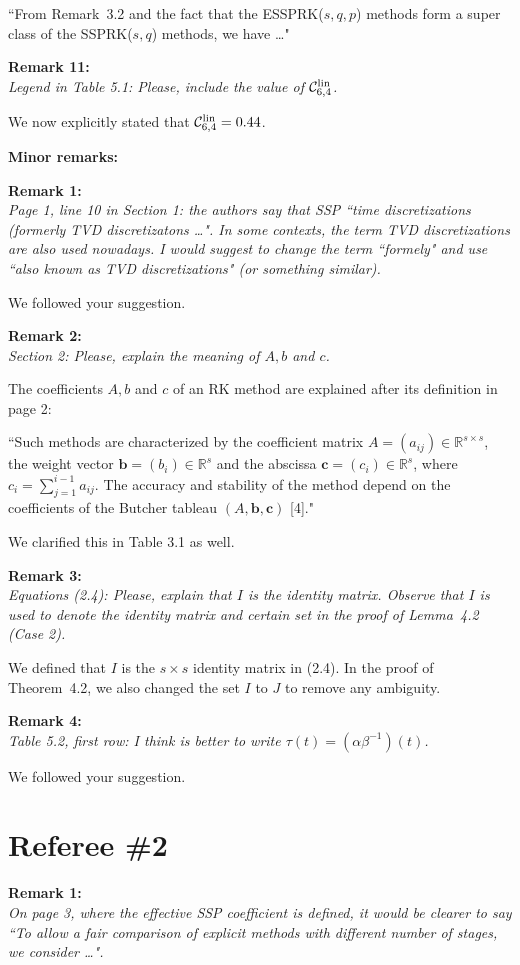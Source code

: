 \documentclass[12pt]{article}
\newcommand{\remark}[2]{\vspace{25pt} \noindent \textbf{Remark #1:\newline} \textit{#2}\vspace{15pt}}
\renewcommand{\newline}{\vspace{15pt}\\}
\newcommand{\sspcoef}{\mathcal{C}}
\begin{document}
``From Remark~3.2 and the fact that the ESSPRK($s,q,p$) methods 
form a super class of the SSPRK($s,q$) methods, we have \dots"

\remark{11}{
Legend in Table 5.1: Please, include the value of $\sspcoef^{\textnormal{lin}}_{6,4}$.}

We now explicitly stated that $\sspcoef^{\textnormal{lin}}_{6,4}=0.44$.
\vspace{20pt}

\noindent \textbf{\large Minor remarks:}

\remark{1}{
Page 1, line 10 in Section 1: the authors say that SSP ``time discretizations (formerly
TVD discretizatons \dots". 
In some contexts, the term TVD discretizations are also used nowadays. 
I would suggest to change the term ``formely" and use ``also known as TVD discretizations" 
(or something similar).}

We followed your suggestion.

\remark{2}{
Section 2: Please, explain the meaning of $A, b$ and $c$.}

The coefficients $A, b$ and $c$ of an RK method are explained after its definition in page 2:

``Such methods are characterized by the coefficient matrix $A = (a_{ij}) \in 
\mathbb{R}^{s \times s}$, the weight vector $\bm{b} = (b_i) \in \mathbb{R}^s$
and the abscissa $\bm{c} = (c_i) \in \mathbb{R}^s$, where 
$c_i = \sum_{j=1}^{i-1}a_{ij}$.
The accuracy and stability of the method depend on the coefficients of the 
Butcher tableau $(A,\bm{b},\bm{c})$ [4]."

We clarified this in Table 3.1 as well.

\remark{3}{
Equations (2.4): Please, explain that $I$ is the identity matrix. Observe that $I$ is used to
denote the identity matrix and certain set in the proof of Lemma~4.2 (Case 2).}

We defined that $I$ is the $s \times s$ identity matrix in (2.4).
In the proof of Theorem~4.2, we also changed the set $I$ to $J$ to remove any ambiguity.

\remark{4}{
Table 5.2, first row: I think is better to write $\tau(t) = (\alpha\beta^{-1})(t)$.}

We followed your suggestion.

\vspace{50pt}

\section*{Referee \#2}
\remark{1}{
On page 3, where the effective SSP coefficient is defined, it would be clearer to say
``To allow a fair comparison of explicit methods with different number of stages, we consider \dots". }
\end{document}
